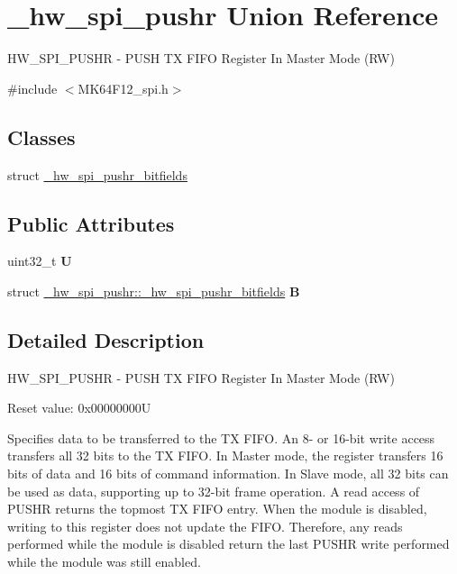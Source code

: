 \hypertarget{union__hw__spi__pushr}{}\section{\+\_\+hw\+\_\+spi\+\_\+pushr Union Reference}
\label{union__hw__spi__pushr}


H\+W\+\_\+\+S\+P\+I\+\_\+\+P\+U\+S\+HR -\/ P\+U\+SH TX F\+I\+FO Register In Master Mode (RW)  




{\ttfamily \#include $<$M\+K64\+F12\+\_\+spi.\+h$>$}

\subsection*{Classes}
\begin{DoxyCompactItemize}
\item 
struct \hyperlink{struct__hw__spi__pushr_1_1__hw__spi__pushr__bitfields}{\+\_\+hw\+\_\+spi\+\_\+pushr\+\_\+bitfields}
\end{DoxyCompactItemize}
\subsection*{Public Attributes}
\begin{DoxyCompactItemize}
\item 
uint32\+\_\+t {\bfseries U}\hypertarget{union__hw__spi__pushr_a47760b3d8b24d0aea0589de80cdcd944}{}\label{union__hw__spi__pushr_a47760b3d8b24d0aea0589de80cdcd944}

\item 
struct \hyperlink{struct__hw__spi__pushr_1_1__hw__spi__pushr__bitfields}{\+\_\+hw\+\_\+spi\+\_\+pushr\+::\+\_\+hw\+\_\+spi\+\_\+pushr\+\_\+bitfields} {\bfseries B}\hypertarget{union__hw__spi__pushr_a78b2d1021363e168f2aa8773ed6e5757}{}\label{union__hw__spi__pushr_a78b2d1021363e168f2aa8773ed6e5757}

\end{DoxyCompactItemize}


\subsection{Detailed Description}
H\+W\+\_\+\+S\+P\+I\+\_\+\+P\+U\+S\+HR -\/ P\+U\+SH TX F\+I\+FO Register In Master Mode (RW) 

Reset value\+: 0x00000000U

Specifies data to be transferred to the TX F\+I\+FO. An 8-\/ or 16-\/bit write access transfers all 32 bits to the TX F\+I\+FO. In Master mode, the register transfers 16 bits of data and 16 bits of command information. In Slave mode, all 32 bits can be used as data, supporting up to 32-\/bit frame operation. A read access of P\+U\+S\+HR returns the topmost TX F\+I\+FO entry. When the module is disabled, writing to this register does not update the F\+I\+FO. Therefore, any reads performed while the module is disabled return the last P\+U\+S\+HR write performed while the module was still enabled. 

